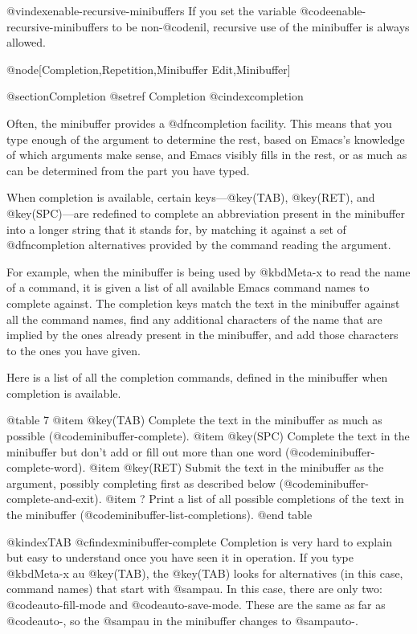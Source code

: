 {{{{@vindex{enable-recursive-minibuffers}
  If you set the variable @code{enable-recursive-minibuffers} to be
non-@code{nil}, recursive use of the minibuffer is always allowed.

@node[Completion,Repetition,Minibuffer Edit,Minibuffer]

@section{Completion}
@setref Completion
@cindex{completion}

  Often, the minibuffer provides a @dfn{completion} facility.  This means that you
type enough of the argument to determine the rest, based on Emacs's knowledge of
which arguments make sense, and Emacs visibly fills in the rest, or as much as can
be determined from the part you have typed.

  When completion is available, certain keys---@key(TAB), @key(RET),
and @key(SPC)---are redefined to complete an abbreviation present in the
minibuffer into a longer string that it stands for, by matching it against
a set of @dfn{completion alternatives} provided by the command reading the
argument.

  For example, when the minibuffer is being used by @kbd{Meta-x} to
read the name of a command, it is given a list of all available
Emacs command names to complete against.  The completion keys
match the text in the minibuffer against all the command names, find
any additional characters of the name that are implied by the ones
already present in the minibuffer, and add those characters to the ones
you have given.

  Here is a list of all the completion commands, defined in the
minibuffer when completion is available.

@table 7
@item @key(TAB)
Complete the text in the minibuffer as much as possible
(@code{minibuffer-complete}).
@item @key(SPC)
Complete the text in the minibuffer but don't add or fill out more than
one word (@code{minibuffer-complete-word}).
@item @key(RET)
Submit the text in the minibuffer as the argument, possibly completing first
as described below (@code{minibuffer-complete-and-exit}).
@item ?
Print a list of all possible completions of the text in the minibuffer
(@code{minibuffer-list-completions}).
@end table

@kindex{TAB}
@cfindex{minibuffer-complete}
  Completion is very hard to explain but easy to understand once you have
seen it in operation.  If you type @kbd{Meta-x au @key(TAB)}, the @key(TAB)
looks for alternatives (in this case, command names) that start with
@samp{au}.  In this case, there are only two: @code{auto-fill-mode} and
@code{auto-save-mode}.  These are the same as far as @code{auto-}, so the
@samp{au} in the minibuffer changes to @samp{auto-}.

}}}}
